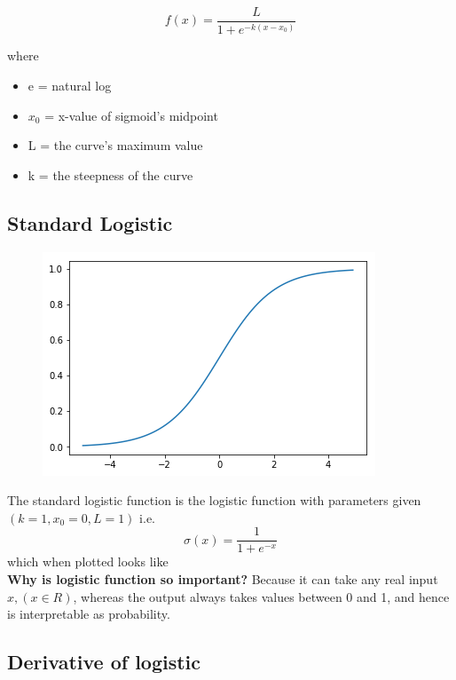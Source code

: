 \documentclass[10pt,a4paper]{article}
\begin{document}
	\begin{equation}
			f(x) = \frac{L}{1 + e^{-k(x-x_0)}}
	\end{equation}

	
	where
	\begin{itemize}
		\item e = natural log
		\item $x_0$ = x-value of sigmoid's midpoint
		\item L = the curve's maximum value
		\item k = the steepness of the curve
	\end{itemize}

	\subsection{Standard Logistic}
	
		\begin{figure}[h]
		\includegraphics[scale=0.65]{sigmoidplot}
		\centering
	\end{figure}
	
	The standard logistic function is the logistic function with parameters given $(k = 1, x_0 = 0, L = 1)$
	i.e.\\
	\begin{equation}
		\sigma(x) = \frac{1}{1 + e^{-x}}
	\end{equation}
	which when plotted looks like\\


	\textbf{Why is logistic function so important?}
	Because it can take any real input $x, (x \in R)$, whereas the output always takes values between 0 and 1, and hence is interpretable as probability.
	
	
	\subsection{Derivative of logistic}
	
\end{document}
